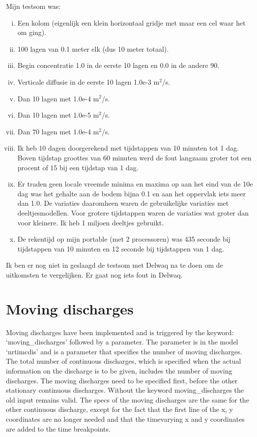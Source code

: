 \documentclass[english]{deltares_manual}
\begin{document}
Mijn testsom was:
\begin{enumerate}[(i)]
	\item Een kolom (eigenlijk een klein horizontaal gridje met maar een cel waar het om ging).
	\item 100 lagen van 0.1 meter elk (dus 10 meter totaal).
	\item Begin concentratie 1.0 in de eerste 10 lagen en 0.0 in de andere 90.
	\item Verticale diffusie in de eerste 10 lagen 1.0e-3 m$^{2}$/s.
	\item Dan 10 lagen met 1.0e-4 m$^{2}$/s.
	\item Dan 10 lagen met 1.0e-5 m$^{2}$/s.
	\item Dan 70 lagen met 1.0e-4 m$^{2}$/s.
	\item Ik heb 10 dagen doorgerekend met tijdstappen van 10 minuten tot 1 dag. Boven tijdstap groottes van 60 minuten werd de fout langzaam groter tot een procent of 15 bij een tijdstap van 1 dag.
	\item Er traden geen locale vreemde minima en maxima op aan het eind van de 10e dag was het gehalte aan de bodem bijna 0.1 en aan het oppervlak iets meer dan 1.0. De variaties daaromheen waren de gebruikelijke variaties met deeltjesmodellen. Voor grotere tijdstappen waren de variaties wat groter dan voor kleinere. Ik heb 1 miljoen deeltjes gebruikt.
	\item De rekentijd op mijn portable (met 2 processoren) was 435 seconde bij tijdstappen van 10 minuten en 12 seconde bij tijdstappen van 1 dag.
\end{enumerate}

Ik ben er nog niet in geslaagd de testsom met Delwaq na te doen om de uitkomsten te vergelijken. Er gaat nog iets fout in Delwaq.


\section{Moving discharges}
Moving discharges have been implemented and is triggered by the keyword:
‘moving\_discharges’  followed by a parameter. 
The parameter is in the model ‘nrtimcdis’ and is a parameter that specifies the number of moving discharges.
The total number of continuous discharges, which is specified when the actual information on the discharge is to be given, includes the number of moving discharges. The moving discharges need to be specified first, before the other stationary continuous discharges. Without the keyword moving\_discharges the old input remains valid.
The specs of the moving discharges are the same for the other continuous discharge, except for the fact that the first line of the x, y coordinates are no longer needed and that the timevarying x and y coordinates are added to the time breakpoints. 
\end{document}
